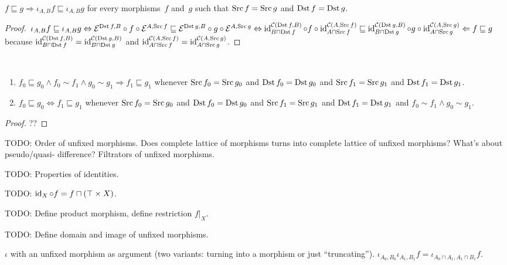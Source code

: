 \begin{lem}
$f\sqsubseteq g\Rightarrow
\iota_{A,B}f\sqsubseteq\iota_{A,B}g$ for every
morphisms~$f$ and~$g$ such that
$\operatorname{Src} f=\operatorname{Src} g$ and $\operatorname{Dst} f=\operatorname{Dst} g$.
\end{lem}

\begin{proof}
$\iota_{A,B}f\sqsubseteq\iota_{A,B}g \Leftrightarrow
\mathcal{E}^{\operatorname{Dst} f,B}\circ f\circ\mathcal{E}^{A,\operatorname{Src} f}
\sqsubseteq
\mathcal{E}^{\operatorname{Dst} g,B}\circ g\circ\mathcal{E}^{A,\operatorname{Src} g}
\Leftrightarrow
\operatorname{id}^{\mathcal{C}(\operatorname{Dst} f,B)}_{B\sqcap\operatorname{Dst} f}\circ f\circ\operatorname{id}^{\mathcal{C}(A,\operatorname{Src} f)}_{A\sqcap\operatorname{Src} f}
\sqsubseteq
\operatorname{id}^{\mathcal{C}(\operatorname{Dst} g,B)}_{B\sqcap\operatorname{Dst} g}\circ g\circ\operatorname{id}^{\mathcal{C}(A,\operatorname{Src} g)}_{A\sqcap\operatorname{Src} g}
\Leftarrow f\sqsubseteq g$ because
$\operatorname{id}^{\mathcal{C}(\operatorname{Dst} f,B)}_{B\sqcap\operatorname{Dst} f}=
\operatorname{id}^{\mathcal{C}(\operatorname{Dst} g,B)}_{B\sqcap\operatorname{Dst} g}$ and
$\operatorname{id}^{\mathcal{C}(A,\operatorname{Src} f)}_{A\sqcap\operatorname{Src} f}=
\operatorname{id}^{\mathcal{C}(A,\operatorname{Src} g)}_{A\sqcap\operatorname{Src} g}$.
\end{proof}

\begin{prop}
~
\begin{enumerate}
\item $f_0\sqsubseteq g_0\land f_0\sim f_1\land g_0\sim g_1
\Rightarrow f_1\sqsubseteq g_1$ whenever
$\operatorname{Src} f_0=\operatorname{Src} g_0$ and $\operatorname{Dst} f_0=\operatorname{Dst} g_0$ and
$\operatorname{Src} f_1=\operatorname{Src} g_1$ and $\operatorname{Dst} f_1=\operatorname{Dst} g_1$.
\item $f_0\sqsubseteq g_0\Leftrightarrow f_1\sqsubseteq g_1$ whenever
$\operatorname{Src} f_0=\operatorname{Src} g_0$ and $\operatorname{Dst} f_0=\operatorname{Dst} g_0$ and
$\operatorname{Src} f_1=\operatorname{Src} g_1$ and $\operatorname{Dst} f_1=\operatorname{Dst} g_1$ and
$f_0\sim f_1\land g_0\sim g_1$.
\end{enumerate}
\end{prop}

\begin{proof}
??
\end{proof}

TODO: Order of unfixed morphisms.
Does complete lattice of morphisms turns into complete
lattice of unfixed morphisms? What's about pseudo/quasi-
difference? Filtrators of unfixed morphisms.

TODO: Properties of identities.

TODO: $\operatorname{id}_X\circ f=f\sqcap(\top\times X)$.

TODO: Define product morphism, define restriction $f|_X$.

TODO: Define domain and image of unfixed morphisms.

$\iota$ with an unfixed morphism as argument (two variants:
turning into a morphism or just ``truncating'').
$\iota_{A_0,B_0}\iota_{A_1,B_1}f=
\iota_{A_0\sqcap A_1,A_1\sqcap B_1}f$.

